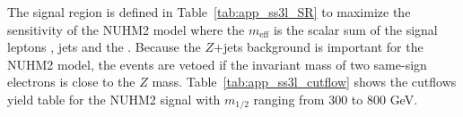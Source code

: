 
The signal region is defined in Table~\ref{tab:app_ss3l_SR} to maximize the sensitivity of the NUHM2 model where the $m_\mathrm{eff}$ is the scalar sum of the signal leptons \pt, jets \pt and the \met.
Because the $Z$+jets background is important for the NUHM2 model, the events are vetoed if the invariant mass of two same-sign electrons is close to the $Z$ mass.
Table~\ref{tab:app_ss3l_cutflow} shows the cutflows yield table for the NUHM2 signal with $m_{1/2}$ ranging from 300 to 800 GeV.

